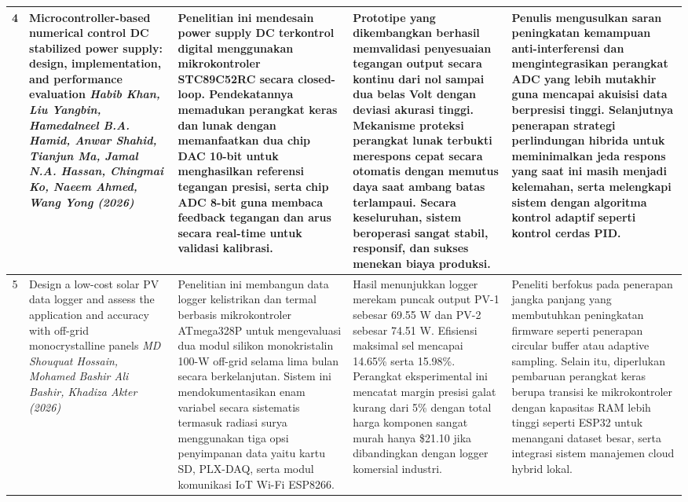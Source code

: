 \documentclass[11pt,a4paper]{article}
\begin{document}
\begin{small}
\begin{longtable}{|c|>{\raggedright\arraybackslash}p{3.2cm}|>{\raggedright\arraybackslash}p{4cm}|>{\raggedright\arraybackslash}p{4cm}|>{\raggedright\arraybackslash}p{4cm}|}
4 & Microcontroller-based numerical control DC stabilized power supply: design, implementation, and performance evaluation \newline \newline \textit{Habib Khan, Liu Yangbin, Hamedalneel B.A. Hamid, Anwar Shahid, Tianjun Ma, Jamal N.A. Hassan, Chingmai Ko, Naeem Ahmed, Wang Yong (2026)} & Penelitian ini mendesain power supply DC terkontrol digital menggunakan mikrokontroler STC89C52RC secara closed-loop. Pendekatannya memadukan perangkat keras dan lunak dengan memanfaatkan dua chip DAC 10-bit untuk menghasilkan referensi tegangan presisi, serta chip ADC 8-bit guna membaca feedback tegangan dan arus secara real-time untuk validasi kalibrasi. & Prototipe yang dikembangkan berhasil memvalidasi penyesuaian tegangan output secara kontinu dari nol sampai dua belas Volt dengan deviasi akurasi tinggi. Mekanisme proteksi perangkat lunak terbukti merespons cepat secara otomatis dengan memutus daya saat ambang batas terlampaui. Secara keseluruhan, sistem beroperasi sangat stabil, responsif, dan sukses menekan biaya produksi. & Penulis mengusulkan saran peningkatan kemampuan anti-interferensi dan mengintegrasikan perangkat ADC yang lebih mutakhir guna mencapai akuisisi data berpresisi tinggi. Selanjutnya penerapan strategi perlindungan hibrida untuk meminimalkan jeda respons yang saat ini masih menjadi kelemahan, serta melengkapi sistem dengan algoritma kontrol adaptif seperti kontrol cerdas PID. \\
\hline

5 & Design a low-cost solar PV data logger and assess the application and accuracy with off-grid monocrystalline panels \newline \newline \textit{MD Shouquat Hossain, Mohamed Bashir Ali Bashir, Khadiza Akter (2026)} & Penelitian ini membangun data logger kelistrikan dan termal berbasis mikrokontroler ATmega328P untuk mengevaluasi dua modul silikon monokristalin 100-W off-grid selama lima bulan secara berkelanjutan. Sistem ini mendokumentasikan enam variabel secara sistematis termasuk radiasi surya menggunakan tiga opsi penyimpanan data yaitu kartu SD, PLX-DAQ, serta modul komunikasi IoT Wi-Fi ESP8266. & Hasil menunjukkan logger merekam puncak output PV-1 sebesar 69.55 W dan PV-2 sebesar 74.51 W. Efisiensi maksimal sel mencapai 14.65\% serta 15.98\%. Perangkat eksperimental ini mencatat margin presisi galat kurang dari 5\% dengan total harga komponen sangat murah hanya \$21.10 jika dibandingkan dengan logger komersial industri. & Peneliti berfokus pada penerapan jangka panjang yang membutuhkan peningkatan firmware seperti penerapan circular buffer atau adaptive sampling. Selain itu, diperlukan pembaruan perangkat keras berupa transisi ke mikrokontroler dengan kapasitas RAM lebih tinggi seperti ESP32 untuk menangani dataset besar, serta integrasi sistem manajemen cloud hybrid lokal. \\
\hline


\end{longtable}
\end{small}
\end{document}
